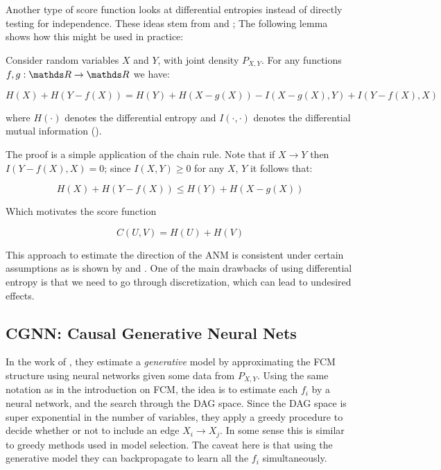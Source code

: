 Another type of score function looks at differential entropies instead of directly testing for independence.
These ideas stem from \cite{kpotufe2014consistency} and \cite{nowzohour2016score}; The following lemma shows how this might be used in practice:

\begin{lemma} Consider random variables $X$ and $Y$, with joint density $P_{X, Y}$. For any functions 
$f, g : \R \rightarrow \R$ we have:

$$
    H(X) + H(Y - f(X)) = H(Y) + H(X - g(X)) - I(X - g(X), Y) + I(Y - f(X), X)
$$

where $H(\cdot)$ denotes the differential entropy and $I(\cdot, \cdot)$ denotes the differential mutual information 
(\cite{cover1999elements}).
\end{lemma}

The proof is a simple application of the chain rule. Note that if $X \rightarrow Y$ then $I(Y - f(X), X) = 0$; 
since $I(X, Y) \geq 0$ for any $X$, $Y$ it follows
that:

$$
    H(X) + H(Y - f(X)) \leq  H(Y) + H(X - g(X))
$$

Which motivates the score function

$$
    C(U, V) = H(U) + H(V)
$$

This approach to estimate the direction of the ANM is consistent under certain assumptions as is shown by 
\cite{kpotufe2014consistency} and \cite{nowzohour2016score}. One of the main drawbacks of using differential
entropy is that we need to go through discretization, which can lead to undesired effects.


\subsection{CGNN: Causal Generative Neural Nets}

In the work of \cite{goudet2017causal}, they estimate a \textit{generative} model by approximating
the FCM structure using neural networks given some data from $P_{X, Y}$. Using the same notation
as in the introduction on FCM, the idea is to estimate each $f_i$ by a neural network, and the 
search through the DAG space. Since the DAG space is super exponential in the number of variables,
they apply a greedy procedure to decide whether or not to include an edge $X_i \rightarrow X_j$.
In some sense this is similar to greedy methods used in model selection. The caveat here is that
using the generative model they can backpropagate to learn all the $f_i$ simultaneously. 

